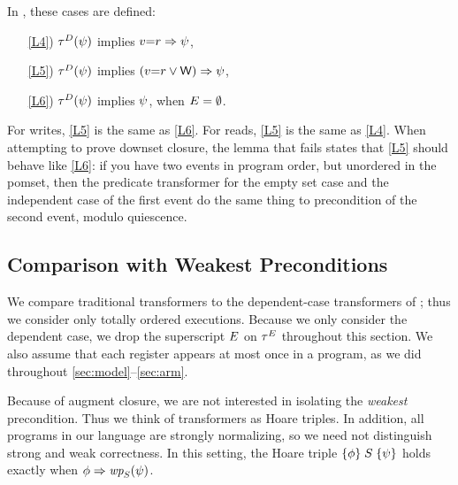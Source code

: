 In , these cases are defined:
\begin{enumerate}
\item[\ref{L4})]
  $\aTr{\bEvs}{\bForm}$ implies $v{=}r\Rightarrow\psi$, 
\item[\ref{L5})]
  $\aTr{\cEvs}{\bForm}$ implies $(v{=}r\lor\mathsf{W})\Rightarrow\psi$,
\item[\ref{L6})] 
  $\aTr{\dEvs}{\bForm}$ implies $\psi$, when $E=\emptyset$.
\end{enumerate}
For writes, \ref{L5} is the same as \ref{L6}.  For reads, \ref{L5} is the
same as \ref{L4}.  When attempting to prove downset closure, the lemma that
fails states that \ref{L5} should behave like \ref{L6}: if you have two
events in program order, but unordered in the pomset, then the predicate
transformer for the empty set case and the independent case of the first
event do the same thing to precondition of the second event, modulo
quiescence.

\subsection{Comparison with Weakest Preconditions}

We compare traditional transformers to the dependent-case transformers of
; thus we consider only totally ordered executions.
Because we only consider the dependent case, we drop the superscript $E$
on $\aTr{\aEvs}{}$ throughout this section.  We also assume that each
register appears at most once in a program, as we did throughout
\textsection\ref{sec:model}--\ref{sec:arm}.

Because of augment closure, we are not interested in isolating the
\emph{weakest} precondition.  Thus we think of transformers as Hoare triples.
In addition, all programs in our language are strongly normalizing, so we
need not distinguish strong and weak correctness.  In this setting, the Hoare
triple $\{\phi\}\allowbreak\;S\;\allowbreak\{\psi\}$ holds exactly when
$\aForm \limplies \fwp{\aCmd}{\bForm}$.

